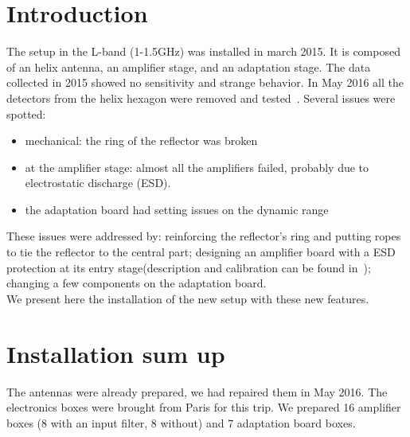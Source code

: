 \section{Introduction}
The setup in the L-band (1-1.5GHz)  was installed in march 2015. It is
composed of  an helix antenna,  an amplifier stage, and  an adaptation
stage. The  data collected in  2015 showed no sensitivity  and strange
behavior. In  May 2016 all the  detectors from the  helix hexagon were
removed  and  tested~\cite{helixstatusmay2016}.  Several  issues  were
spotted:
\begin{itemize}
\item mechanical: the ring of the reflector was broken
\item  at  the amplifier  stage:  almost  all  the amplifiers  failed,
  probably due to electrostatic discharge (ESD).
\item the adaptation board had setting issues on the dynamic range
\end{itemize}
These issues  were addressed  by: reinforcing
the reflector's  ring and  putting ropes to  tie the reflector  to the
central part;  designing an amplifier  board with a ESD  protection at
its  entry   stage(description  and   calibration  can  be   found  in~\cite{lnatesting});  changing  a  few  components  on  the  adaptation
board.\\ We present here the  installation of the new setup with these
new features.

\section{Installation sum up}
The  antennas were  already  prepared,  we had  repaired  them in  May
2016. The electronics boxes were  brought from Paris for this trip. We
prepared 16 amplifier boxes (8 with  an input filter, 8 without) and 7
adaptation board boxes.
